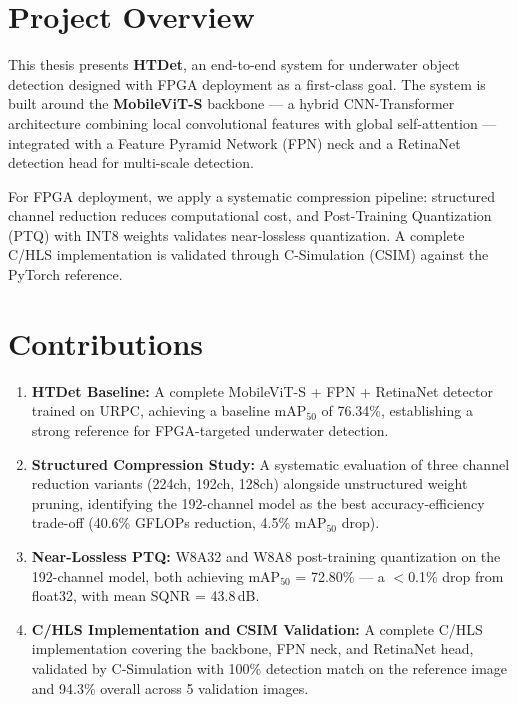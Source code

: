 \section{Project Overview}

This thesis presents \textbf{HTDet}, an end-to-end system for underwater object detection designed with FPGA deployment as a first-class goal. The system is built around the \textbf{MobileViT-S} backbone — a hybrid CNN-Transformer architecture combining local convolutional features with global self-attention — integrated with a Feature Pyramid Network (FPN) neck and a RetinaNet detection head for multi-scale detection.

For FPGA deployment, we apply a systematic compression pipeline: structured channel reduction reduces computational cost, and Post-Training Quantization (PTQ) with INT8 weights validates near-lossless quantization. A complete C/HLS implementation is validated through C-Simulation (CSIM) against the PyTorch reference.

\section{Contributions}

\begin{enumerate}
    \item \textbf{HTDet Baseline:} A complete MobileViT-S + FPN + RetinaNet detector trained on URPC, achieving a baseline mAP$_{50}$ of 76.34\%, establishing a strong reference for FPGA-targeted underwater detection.

    \item \textbf{Structured Compression Study:} A systematic evaluation of three channel reduction variants (224ch, 192ch, 128ch) alongside unstructured weight pruning, identifying the 192-channel model as the best accuracy-efficiency trade-off (40.6\% GFLOPs reduction, 4.5\% mAP$_{50}$ drop).

    \item \textbf{Near-Lossless PTQ:} W8A32 and W8A8 post-training quantization on the 192-channel model, both achieving mAP$_{50}$ = 72.80\% — a $<$0.1\% drop from float32, with mean SQNR = 43.8\,dB.

    \item \textbf{C/HLS Implementation and CSIM Validation:} A complete C/HLS implementation covering the backbone, FPN neck, and RetinaNet head, validated by C-Simulation with 100\% detection match on the reference image and 94.3\% overall across 5 validation images.
\end{enumerate}

